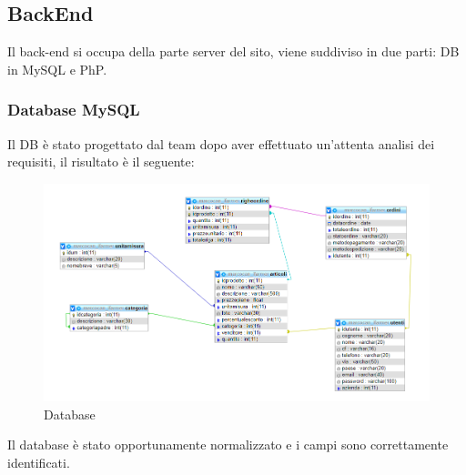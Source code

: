 \subsection{BackEnd}
Il back-end si occupa della parte server del sito, viene suddiviso in due parti: DB in MySQL e PhP.

\subsubsection{Database MySQL}
Il DB è stato progettato dal team dopo aver effettuato un'attenta analisi dei requisiti, il risultato è il seguente:
\begin{figure}[H]
	\includegraphics[width=\linewidth]{res/img/DB}
	\caption{Database}
	\label{Database Walk And Buy}
\end{figure}
Il database è stato opportunamente normalizzato e i campi sono correttamente identificati.


